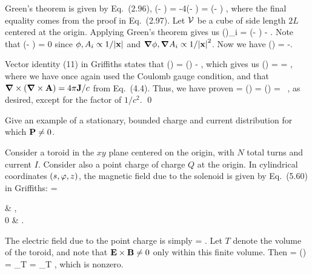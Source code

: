 \begin{solution}
	Green's theorem is given by Eq.~(2.96),
	\beq
		\intS \nh \cdot (\phiq \grad\phiw - \phiw \grad\phiq) \dS = -4\pi \intcV(\phiq \rhow - \phiw \rhoq) \dcx
		= \intcV (\phiq \lap\phiw - \phiw \lap\phiq) \dcx,
	\eeq
	where the final equality comes from the proof in Eq.~(2.97).  Let $\mathcal{V}$ be a cube of side length $2L$ centered at the origin.  Applying Green's theorem gives us
	\beq
		\intcV (\vE \times \vB)_i \dcx = \intS \nh \cdot (\phi \grad\Ai - \Ai \grad\phi) \dS - \intcV \phi \lap\Ai \dcx.
	\eeq
	Note that
	\beq
		\limLi \intS \nh \cdot (\phi \grad\Ai - \Ai \grad\phi) \dS \propto \limLi \intS {} \dS = 0
	\eeq
	since $\phi, A_i \propto 1/\abs{\vb{x}}$ and $\grad\phi, \grad A_i \propto 1/\abs{\vb{x}}^2$.  Now we have
	\beq
		\int (\vE \times \vB) \dcx = -\int \phi \lap\vA \dcx.
	\eeq
	
	Vector identity (11) in Griffiths states that
	\beq
		\grad \times (\grad \times \vaa) = \grad (\grad \cdot \vaa) - \lap\vaa,
	\eeq
	which gives us
	\beq
		\int (\vE \times \vB) \dcx = \int \phi [\grad \times (\grad \times \vA) - \grad (\grad \cdot \vA)] \dcx
		=  \int \phi \vJ \dcx,
	\eeq
	where we have once again used the Coulomb gauge condition, and that $\grad \times (\grad \times \vb{A}) = 4\pi \vb{J} / c$ from Eq.~(4.4).  Thus, we have proven
	\beq
		\vP = \int \cP(\vx) \dcx =  \int (\vE \times \vB) \dcx =  \int \phix \, \vJx \dcx,
	\eeq
	as desired, except for the factor of $1 / c^2$. \qed
	
\end{solution}


\clearpage
\begin{problem}
	Give an example of a stationary, bounded charge and current distribution for which $\vb{P} \neq 0$.
\end{problem}

\begin{solution}
	Consider a toroid in the $xy$ plane centered on the origin, with $N$ total turns and current $I$.  Consider also a point charge of charge $Q$ at the origin.  In cylindrical coordinates $(s, \varphi, z)$, the magnetic field due to the solenoid is given by Eq.~(5.60) in Griffiths:
	\beq
		\vBx = \begin{cases}
			 \phh & , \\[2ex]
			0 & .
		\end{cases}
	\eeq
	The electric field due to the point charge is simply
	\beq
		\vE =  \rh.
	\eeq
	Let $T$ denote the volume of the toroid, and note that $\vb{E} \times \vb{B} \neq 0$ only within this finite volume.  Then
	\beq
		\vP =  \int (\vE \times \vB) \dcx
		=  \int_T  \dcx
		=  \zh \int_T ,
	\eeq
	which is nonzero.
\end{solution}